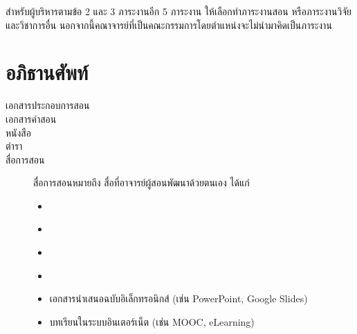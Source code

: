 \documentclass[a4paper,12pt,english]{sphinxmanual}
\begin{document}
สำหรับผู้บริหารตามข้อ 2 และ 3 ภาระงานอีก 5 ภาระงาน ให้เลือกทำภาระงานสอน หรือภาระงานวิจัยและวิชาการอื่น นอกจากนี้คณาจารย์ที่เป็นคณะกรรมการโดยตำแหน่งจะไม่นำมาคิดเป็นภาระงาน


\chapter{อภิธานศัพท์}
\label{\detokenize{glossary:id1}}\label{\detokenize{glossary::doc}}\begin{description}
\item[{เอกสารประกอบการสอน\label{\detokenize{glossary:term-0}}}] \leavevmode

\item[{เอกสารคำสอน\label{\detokenize{glossary:term-1}}}] \leavevmode

\item[{หนังสือ\label{\detokenize{glossary:term-2}}}] \leavevmode

\item[{ตำรา\label{\detokenize{glossary:term-3}}}] \leavevmode

\item[{สื่อการสอน\label{\detokenize{glossary:term-4}}}] \leavevmode
สื่อการสอนหมายถึง สื่อที่อาจารย์ผู้สอนพัฒนาด้วยตนเอง ได้แก่
\begin{itemize}
\item {} 
{\hyperref[\detokenize{glossary:term-0}]{}}

\item {} 
{\hyperref[\detokenize{glossary:term-1}]{}}

\item {} 
{\hyperref[\detokenize{glossary:term-2}]{}}

\item {} 
{\hyperref[\detokenize{glossary:term-3}]{}}

\item {} 
เอกสารนำเสนอฉบับอิเล็กทรอนิกส์ (เช่น PowerPoint, Google Slides)

\item {} 
บทเรียนในระบบอินเตอร์เน็ต (เช่น MOOC, e\sphinxhyphen{}Learning)


\end{itemize}
\end{description}
\end{document}
